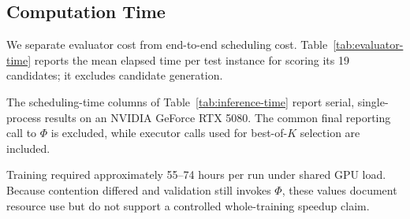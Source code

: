 \subsection{Computation Time}

We separate evaluator cost from end-to-end scheduling cost.
Table~\ref{tab:evaluator-time} reports the mean elapsed time
per test instance for scoring its 19 candidates; it excludes candidate
generation.

The scheduling-time columns of Table~\ref{tab:inference-time} report serial,
single-process results on an NVIDIA GeForce RTX 5080. The common final
reporting call to $\Phi$ is excluded, while executor calls used for
best-of-$K$ selection are included.

Training required approximately 55--74 hours per run under shared GPU load.
Because contention differed and validation still invokes $\Phi$, these values
document resource use but do not support a controlled whole-training speedup
claim.
